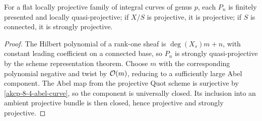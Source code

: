 \begin{theorem}
\label{akcp-8-5-fixed-euler}
For a flat locally projective family of integral curves of genus $p$, each
$P_n$ is finitely presented and locally quasi-projective; if $X/S$ is
projective, it is projective; if $S$ is connected, it is strongly projective.
\end{theorem}
\begin{proof}
The Hilbert polynomial of a rank-one sheaf is
$\deg(X_s)m+n$, with constant leading coefficient on a connected base, so
$P_n$ is strongly quasi-projective by the scheme representation theorem.  Choose
$m$ with the corresponding polynomial negative and twist by $\mathcal O(m)$, reducing
to a sufficiently large Abel component.  The Abel map from the projective Quot
scheme is surjective by \cref{akcp-8-4-abel-curve}, so the component is
universally closed.  Its inclusion into an ambient projective bundle is then
closed, hence projective and strongly projective.
\end{proof}

